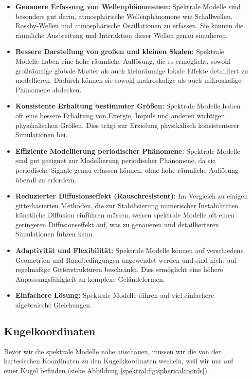 \begin{itemize}
\item
\textbf{Genauere Erfassung von Wellenphänomenen:} Spektrale Modelle sind besonders gut darin, atmosphärische Wellenphänomene wie Schallwellen, Rossby-Wellen und atmosphärische Oszillationen zu erfassen.
Sie können die räumliche Ausbreitung und Interaktion dieser Wellen genau simulieren.
\item
\textbf{Bessere Darstellung von großen und kleinen Skalen:} Spektrale Modelle haben eine hohe räumliche Auflösung, die es ermöglicht, sowohl großräumige globale Muster als auch kleinräumige lokale Effekte detailliert zu modellieren.
Dadurch können sie sowohl makroskalige als auch mikroskalige Phänomene abdecken.
\item
\textbf{Konsistente Erhaltung bestimmter Größen:} Spektrale Modelle haben oft eine bessere Erhaltung von Energie, Impuls und anderen wichtigen physikalischen Größen.
Dies trägt zur Erzielung physikalisch konsistenterer Simulationen bei.
\item
\textbf{Effiziente Modellierung periodischer Phänomene:} Spektrale Modelle sind gut geeignet zur Modellierung periodischer Phänomene, da sie periodische Signale genau erfassen können, ohne hohe räumliche Auflösung überall zu erfordern.
\item
\textbf{Reduzierter Diffusionseffekt (Rauschresistent):} Im Vergleich zu einigen gitterbasierten Methoden, die zur Stabilisierung numerischer Instabilitäten künstliche Diffusion einführen müssen, weisen spektrale Modelle oft einen geringeren Diffusionseffekt auf, was zu genaueren und detaillierteren Simulationen führen kann.
\item
\textbf{Adaptivität und Flexibilität:} Spektrale Modelle können auf verschiedene Geometrien und Randbedingungen angewendet werden und sind nicht auf regelmäßige Gitterstrukturen beschränkt.
Dies ermöglicht eine höhere Anpassungsfähigkeit an komplexe Geländeformen.
\item
\textbf{Einfachere Lösung:} Spektrale Modelle führen auf viel einfachere algebraische Gleichungen.
\end{itemize}

\subsection{Kugelkoordinaten
\label{spektral:subsection:kugelkoordinaten}}

Bevor wir die spektrale Modelle nähe anschauen, müssen wir die von den kartesischen Koordinaten zu den Kugelkkordinaten wecheln, weil wir uns auf einer Kugel befinden (siehe Abbildung \ref{spektral:fig:sphericalcoords}).

